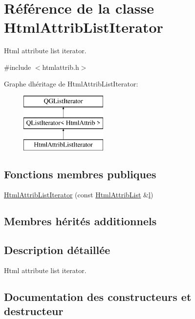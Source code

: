 \hypertarget{class_html_attrib_list_iterator}{}\section{Référence de la classe Html\+Attrib\+List\+Iterator}
\label{class_html_attrib_list_iterator}


Html attribute list iterator.  




{\ttfamily \#include $<$htmlattrib.\+h$>$}

Graphe d\textquotesingle{}héritage de Html\+Attrib\+List\+Iterator\+:\begin{figure}[H]
\begin{center}
\leavevmode
\includegraphics[height=3.000000cm]{class_html_attrib_list_iterator}
\end{center}
\end{figure}
\subsection*{Fonctions membres publiques}
\begin{DoxyCompactItemize}
\item 
\hyperlink{class_html_attrib_list_iterator_afee20194ed45e3b90a0c6d8837d7427f}{Html\+Attrib\+List\+Iterator} (const \hyperlink{class_html_attrib_list}{Html\+Attrib\+List} \&\hyperlink{060__command__switch_8tcl_aff56f84b49947b84b2a304f51cf8e678}{l})
\end{DoxyCompactItemize}
\subsection*{Membres hérités additionnels}


\subsection{Description détaillée}
Html attribute list iterator. 

\subsection{Documentation des constructeurs et destructeur}
\hypertarget{class_html_attrib_list_iterator_afee20194ed45e3b90a0c6d8837d7427f}{}
